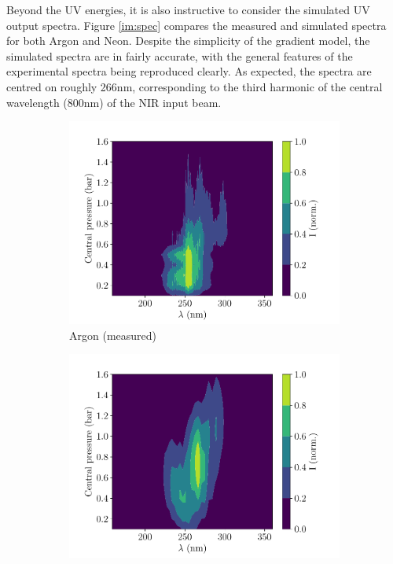 \documentclass[a4paper]{jpconf}
\begin{document}
Beyond the UV energies, it is also instructive to consider the simulated UV output spectra. Figure \ref{im:spec} compares the measured and simulated spectra for both Argon and Neon. Despite the simplicity of the gradient model, the simulated spectra are in fairly accurate, with the general features of the experimental spectra being reproduced clearly. As expected, the spectra are centred on roughly 266nm, corresponding to the third harmonic of the central wavelength (800nm) of the NIR input beam. \par  
\begin{figure}[h]
\centering
 \begin{subfigure}{0.49\textwidth}
        \includegraphics[width=\textwidth]{im/2d_spectra_pres_Ar_150mW_meas}
    \caption{Argon (measured)}
    \end{subfigure}
    \begin{subfigure}{0.49\textwidth}
        \includegraphics[width=\textwidth]{im/2d_Ar_sim}

\end{subfigure}
\end{figure}
\end{document}
